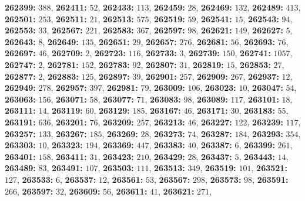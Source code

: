\textsf{\bfseries 262399:} $388$, \textsf{\bfseries 262411:} $52$, \textsf{\bfseries 262433:} $113$, \textsf{\bfseries 262459:} $28$, \textsf{\bfseries 262469:} $132$, \textsf{\bfseries 262489:} $413$, \textsf{\bfseries 262501:} $253$, \textsf{\bfseries 262511:} $21$, \textsf{\bfseries 262513:} $575$, \textsf{\bfseries 262519:} $59$, \textsf{\bfseries 262541:} $15$, \textsf{\bfseries 262543:} $94$, \textsf{\bfseries 262553:} $33$, \textsf{\bfseries 262567:} $221$, \textsf{\bfseries 262583:} $367$, \textsf{\bfseries 262597:} $98$, \textsf{\bfseries 262621:} $149$, \textsf{\bfseries 262627:} $5$, \textsf{\bfseries 262643:} $8$, \textsf{\bfseries 262649:} $135$, \textsf{\bfseries 262651:} $29$, \textsf{\bfseries 262657:} $276$, \textsf{\bfseries 262681:} $56$, \textsf{\bfseries 262693:} $76$, \textsf{\bfseries 262697:} $46$, \textsf{\bfseries 262709:} $2$, \textsf{\bfseries 262723:} $116$, \textsf{\bfseries 262733:} $3$, \textsf{\bfseries 262739:} $150$, \textsf{\bfseries 262741:} $1057$, \textsf{\bfseries 262747:} $2$, \textsf{\bfseries 262781:} $152$, \textsf{\bfseries 262783:} $92$, \textsf{\bfseries 262807:} $31$, \textsf{\bfseries 262819:} $15$, \textsf{\bfseries 262853:} $27$, \textsf{\bfseries 262877:} $2$, \textsf{\bfseries 262883:} $125$, \textsf{\bfseries 262897:} $39$, \textsf{\bfseries 262901:} $257$, \textsf{\bfseries 262909:} $267$, \textsf{\bfseries 262937:} $12$, \textsf{\bfseries 262949:} $278$, \textsf{\bfseries 262957:} $397$, \textsf{\bfseries 262981:} $79$, \textsf{\bfseries 263009:} $106$, \textsf{\bfseries 263023:} $10$, \textsf{\bfseries 263047:} $54$, \textsf{\bfseries 263063:} $156$, \textsf{\bfseries 263071:} $58$, \textsf{\bfseries 263077:} $71$, \textsf{\bfseries 263083:} $98$, \textsf{\bfseries 263089:} $117$, \textsf{\bfseries 263101:} $18$, \textsf{\bfseries 263111:} $14$, \textsf{\bfseries 263119:} $60$, \textsf{\bfseries 263129:} $185$, \textsf{\bfseries 263167:} $46$, \textsf{\bfseries 263171:} $30$, \textsf{\bfseries 263183:} $55$, \textsf{\bfseries 263191:} $636$, \textsf{\bfseries 263201:} $76$, \textsf{\bfseries 263209:} $257$, \textsf{\bfseries 263213:} $46$, \textsf{\bfseries 263227:} $122$, \textsf{\bfseries 263239:} $117$, \textsf{\bfseries 263257:} $133$, \textsf{\bfseries 263267:} $185$, \textsf{\bfseries 263269:} $28$, \textsf{\bfseries 263273:} $74$, \textsf{\bfseries 263287:} $184$, \textsf{\bfseries 263293:} $354$, \textsf{\bfseries 263303:} $10$, \textsf{\bfseries 263323:} $194$, \textsf{\bfseries 263369:} $447$, \textsf{\bfseries 263383:} $40$, \textsf{\bfseries 263387:} $6$, \textsf{\bfseries 263399:} $261$, \textsf{\bfseries 263401:} $158$, \textsf{\bfseries 263411:} $31$, \textsf{\bfseries 263423:} $210$, \textsf{\bfseries 263429:} $28$, \textsf{\bfseries 263437:} $5$, \textsf{\bfseries 263443:} $14$, \textsf{\bfseries 263489:} $83$, \textsf{\bfseries 263491:} $107$, \textsf{\bfseries 263503:} $111$, \textsf{\bfseries 263513:} $349$, \textsf{\bfseries 263519:} $101$, \textsf{\bfseries 263521:} $127$, \textsf{\bfseries 263533:} $6$, \textsf{\bfseries 263537:} $12$, \textsf{\bfseries 263561:} $53$, \textsf{\bfseries 263567:} $298$, \textsf{\bfseries 263573:} $98$, \textsf{\bfseries 263591:} $266$, \textsf{\bfseries 263597:} $32$, \textsf{\bfseries 263609:} $56$, \textsf{\bfseries 263611:} $41$, \textsf{\bfseries 263621:} $271$, 
